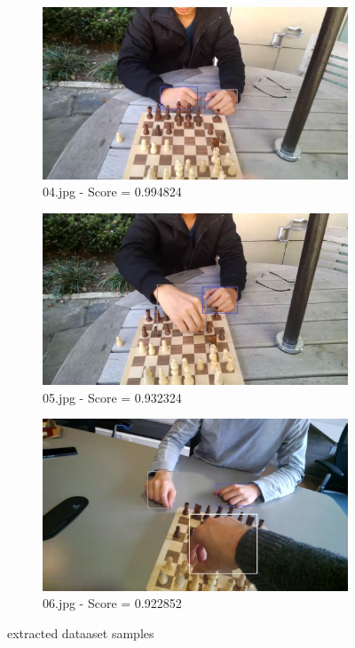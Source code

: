 \begin{figure}
    \centering
    \begin{subfigure}[b]{0.3 \textwidth}
        \centering
        \includegraphics[width=\textwidth]{images/handDetection/04.jpg}
        \caption{04.jpg - Score = 0.994824}
       
    \end{subfigure}
    \hfill
    \begin{subfigure}[b]{0.3\textwidth}
        \centering
        \includegraphics[width=\textwidth]{images/handDetection/05.jpg}
        \caption{05.jpg - Score = 0.932324}
        
    \end{subfigure}
    \begin{subfigure}[b]{0.3\textwidth}
        \centering
        \includegraphics[width=\textwidth]{images/handDetection/06.jpg}
        \caption{06.jpg - Score = 0.922852}
        
    \end{subfigure}
       \caption{extracted dataaset samples}
       
\end{figure}


